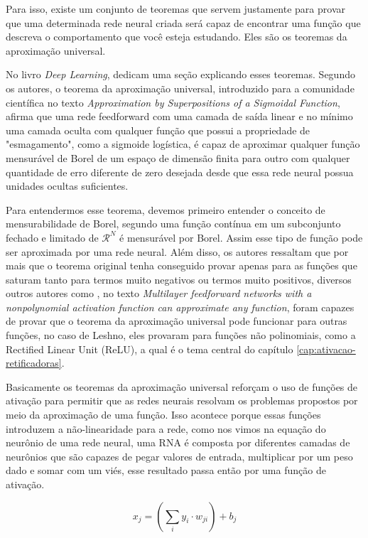 Para isso, existe um conjunto de teoremas que servem justamente para provar que uma determinada rede neural criada será capaz de encontrar uma função que descreva o comportamento que você esteja estudando. Eles são os teoremas da aproximação universal.

No livro \textit{Deep Learning}, \textcite{DeepLearningBook} dedicam uma seção explicando esses teoremas. Segundo os autores, o teorema da aproximação universal, introduzido \textcite{Cybenko1989} para a comunidade científica no texto \textit{Approximation by Superpositions of a Sigmoidal Function}, afirma que uma rede feedforward com uma camada de saída linear e no mínimo uma camada oculta com qualquer função que possui a propriedade de "esmagamento", como a sigmoide logística, é capaz de aproximar qualquer função mensurável de Borel de um espaço de dimensão finita para outro com qualquer quantidade de erro diferente de zero desejada desde que essa rede neural possua unidades ocultas suficientes.

Para entendermos esse teorema, devemos primeiro entender o conceito de mensurabilidade de Borel, segundo \textcite{DeepLearningBook} uma função contínua em um subconjunto fechado e limitado de $\mathcal{R}^N$ é mensurável por Borel. Assim esse tipo de função pode ser aproximada por uma rede neural. Além disso, os autores ressaltam que por mais que o teorema original tenha conseguido provar apenas para as funções que saturam tanto para termos muito negativos ou termos muito positivos, diversos outros autores como \textcite{Leshno1993}, no texto \textit{Multilayer feedforward networks with a nonpolynomial activation function can approximate any function}, foram capazes de provar que o teorema da aproximação universal pode funcionar para outras funções, no caso de Leshno, eles provaram para funções não polinomiais, como a Rectified Linear Unit (ReLU), a qual é o tema central do capítulo \ref{cap:ativacao-retificadoras}.

Basicamente os teoremas da aproximação universal reforçam o uso de funções de ativação para permitir que as redes neurais resolvam os problemas propostos por meio da aproximação de uma função. Isso acontece porque essas funções introduzem a não-linearidade para a rede, como nos vimos na equação do neurônio de uma rede neural, uma RNA é composta por diferentes camadas de neurônios que são capazes de pegar valores de entrada, multiplicar por um peso dado e somar com um viés, esse resultado passa então por uma função de ativação.

\[ x_j = (\sum_i y_i \cdot w_{ji}) + b_j \]

